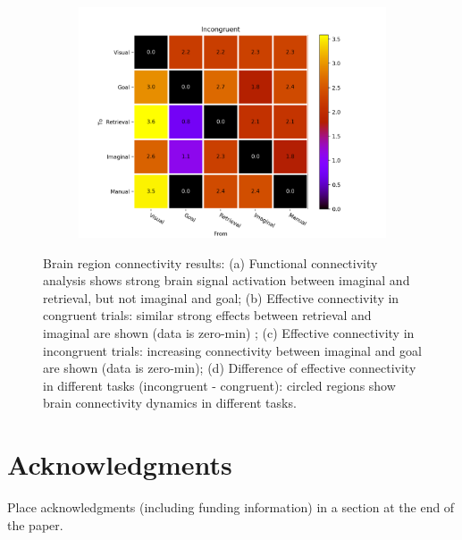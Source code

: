 \documentclass[10pt,letterpaper]{article}
\begin{document}
\begin{figure}[ht]
\begin{subfigure}{.11\textwidth}
  \includegraphics[width=\linewidth]{Incongruent_effect_conn.png}
  \caption{}
\end{subfigure}%
\caption{Brain region connectivity results: (a) Functional connectivity analysis shows strong brain signal activation between imaginal and retrieval, but not imaginal and goal; (b) Effective connectivity in congruent trials: similar strong effects between retrieval and imaginal are shown (data is zero-min) ; (c) Effective connectivity in incongruent trials: increasing connectivity between imaginal and goal are shown (data is zero-min); (d) Difference of effective connectivity in different tasks (incongruent - congruent): circled regions show brain connectivity dynamics in different tasks.}
\label{fig:conn}
\end{figure}


\section{Acknowledgments}

Place acknowledgments (including funding information) in a section at
the end of the paper.



\setlength{\bibleftmargin}{.125in}
\setlength{\bibindent}{-\bibleftmargin}

\end{document}
